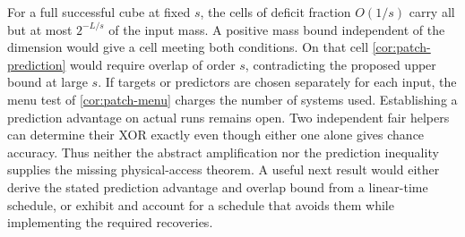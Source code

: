 For a full successful cube at fixed $s$, the cells of deficit fraction
$O(1/s)$ carry all but at most $2^{-L/s}$ of the input mass. A positive
mass bound independent of the dimension would give a cell meeting both
conditions. On that cell \cref{cor:patch-prediction} would require overlap
of order $s$, contradicting the proposed upper bound at large $s$. If
targets or predictors are chosen separately for each input, the menu
test of \cref{cor:patch-menu} charges the number of systems used.
Establishing a prediction advantage on actual runs remains open.
Two independent fair helpers can determine their XOR exactly even though
either one alone gives chance accuracy.
Thus neither the abstract amplification nor the prediction inequality
supplies the missing physical-access theorem. A useful next result
would either derive the stated prediction advantage and overlap bound
from a linear-time schedule, or exhibit and account for a schedule that
avoids them while implementing the required recoveries.
